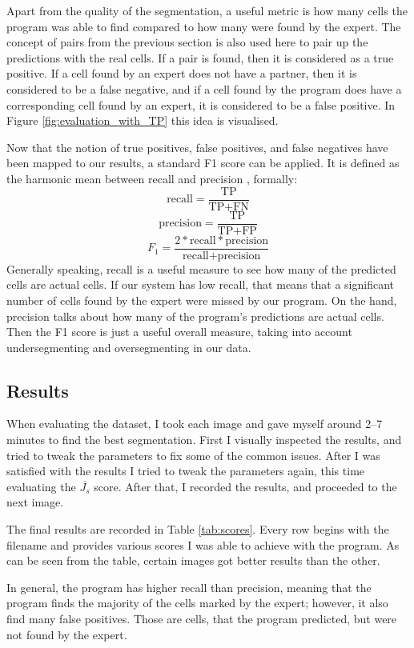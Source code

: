 \documentclass[
  digital,     %
  oneside,     %
  nosansbold,  %
  nocolorbold, %
  lof,         %
  lot,         %
]{fithesis4}
\begin{document}
Apart from the quality of the segmentation, a useful metric is how many cells
the program was able to find compared to how many were found by the expert. The
concept of pairs from the previous section is also used here to pair up the
predictions with the real cells. If a pair is found, then it is considered as a
true positive. If a cell found by an expert does not have a partner, then it is
considered to be a false negative, and if a cell found by the program does have
a corresponding cell found by an expert, it is considered to be a false
positive. In Figure \ref{fig:evaluation_with_TP} this idea is visualised.

Now that the notion of true positives, false positives, and false negatives have
been mapped to our results, a standard F1 score can be applied. It is defined as
the harmonic mean between recall and precision \cite{sklearn-f1score}, formally:
$$\text{recall} = \frac{\text{TP}}{\text{TP} + \text{FN}}$$
$$\text{precision} = \frac{\text{TP}}{\text{TP} + \text{FP}}$$
$$F_1 = \frac{2 * \text{recall} * \text{precision}}{\text{recall} +
\text{precision}}$$
Generally speaking, recall is a useful measure to see how many of the predicted
cells are actual cells. If our system has low recall, that means that a
significant number of cells found by the expert were missed by our program. On
the hand, precision talks about how many of the program's predictions are actual
cells. Then the F1 score is just a useful overall measure, taking into account
undersegmenting and oversegmenting in our data.

\subsection{Results}
When evaluating the dataset, I took each image and gave myself around 2--7
minutes to find the best segmentation. First I visually inspected the results,
and tried to tweak the parameters to fix some of the common issues. After I was
satisfied with the results I tried to tweak the parameters again, this time
evaluating the $\overline{J_s}$ score. After that, I recorded the results, and
proceeded to the next image.

The final results are recorded in Table \ref{tab:scores}. Every row begins
with the filename and provides various scores I was able to achieve with the
program. As can be seen from the table, certain images got better results than
the other.

In general, the program has higher recall than precision, meaning that the
program finds the majority of the cells marked by the expert; however, it also
find many false positives. Those are cells, that the program predicted, but were
not found by the expert.
\end{document}
